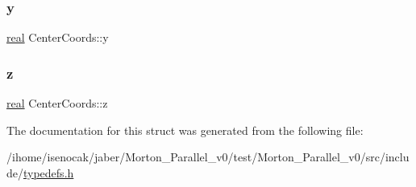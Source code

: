 \subsubsection{\texorpdfstring{y}{y}}
{\footnotesize\ttfamily \mbox{\hyperlink{definitions_8h_aedc0ad84d1e764530814f57ad931d02a}{real}} Center\+Coords\+::y}

\mbox{\label{structCenterCoords_a94d9e8682d79ead6062b061c3c8e5138}} 
\subsubsection{\texorpdfstring{z}{z}}
{\footnotesize\ttfamily \mbox{\hyperlink{definitions_8h_aedc0ad84d1e764530814f57ad931d02a}{real}} Center\+Coords\+::z}



The documentation for this struct was generated from the following file\+:\begin{DoxyCompactItemize}
\item 
/ihome/isenocak/jaber/\+Morton\+\_\+\+Parallel\+\_\+v0/test/\+Morton\+\_\+\+Parallel\+\_\+v0/src/include/\mbox{\hyperlink{typedefs_8h}{typedefs.\+h}}\end{DoxyCompactItemize}

